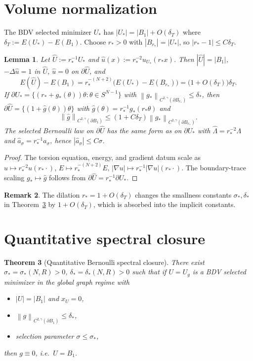 \documentclass[11pt]{article}
\newtheorem{theorem}{Theorem}
\newtheorem{lemma}[theorem]{Lemma}
\theoremstyle{definition}
\newtheorem{remark}[theorem]{Remark}
\newcommand{\norm}[1]{\left\|#1\right\|}
\newcommand{\abs}[1]{\left|#1\right|}
\begin{document}
\section{Volume normalization}\label{sec:volnorm}

The BDV selected minimizer $U_*$ has $\abs{U_*}=\abs{B_1}+O(\delta_T)$ where
$\delta_T:=E(U_*)-E(B_1)$. Choose $r_*>0$ with $\abs{B_{r_*}}=\abs{U_*}$,
so $\abs{r_*-1}\le C\delta_T$.

\begin{lemma}\label{lem:rescale}
Let $\widehat U:=r_*^{-1}U_*$ and $\widehat u(x):=r_*^{-2}u_{U_*}(r_*x)$.
Then $\abs{\widehat U}=\abs{B_1}$, $-\Delta\widehat u=1$ in $\widehat U$,
$\widehat u=0$ on $\partial\widehat U$, and
\[
E(\widehat U)-E(B_1)
=r_*^{-(N+2)}\bigl(E(U_*)-E(B_{r_*})\bigr)
=\bigl(1+O(\delta_T)\bigr)\delta_T.
\]
If $\partial U_*=\{(r_*+g_*(\theta))\theta:\theta\in S^{N-1}\}$
with $\norm{g_*}_{C^{2,\gamma}(\partial B_{r_*})}\le\delta_*$, then
$\partial\widehat U=\{(1+\widehat g(\theta))\theta\}$ with
$\widehat g(\theta)=r_*^{-1}g_*(r_*\theta)$ and
\[
\norm{\widehat g}_{C^{2,\gamma}(\partial B_1)}
\le(1+C\delta_T)\norm{g_*}_{C^{2,\gamma}(\partial B_{r_*})}.
\]
The selected Bernoulli law on $\partial\widehat U$ has the same form as on
$\partial U_*$ with $\widehat\Lambda=r_*^{-2}\Lambda$ and
$\widehat a_\sigma=r_*^{-1}a_\sigma$, hence $\abs{\widehat a_\sigma}\le C\sigma$.
\end{lemma}

\begin{proof}
The torsion equation, energy, and gradient datum scale as $u\mapsto
r_*^{-2}u(r_*\cdot)$, $E\mapsto r_*^{-(N+2)}E$, $\abs{\nabla u}\mapsto
r_*^{-1}\abs{\nabla u}(r_*\cdot)$. The boundary-trace scaling
$g_*\mapsto\widehat g$ follows from $\partial\widehat U=r_*^{-1}\partial U_*$.
\end{proof}

\begin{remark}
The dilation $r_*=1+O(\delta_T)$ changes the smallness constants
$\sigma_*,\delta_*$ in Theorem~\ref{thm:closure} by $1+O(\delta_T)$, which is
absorbed into the implicit constants.
\end{remark}

\section{Quantitative spectral closure}\label{sec:closure}

\begin{theorem}[Quantitative Bernoulli spectral closure]\label{thm:closure}
There exist $\sigma_*=\sigma_*(N,R)>0$, $\delta_*=\delta_*(N,R)>0$ such that
if $U=U_g$ is a BDV selected minimizer in the global graph regime with
\begin{itemize}
\item $\abs{U}=\abs{B_1}$ and $x_U=0$,
\item $\norm{g}_{C^{2,\gamma}(\partial B_1)}\le\delta_*$,
\item selection parameter $\sigma\le\sigma_*$,
\end{itemize}
then $g\equiv0$, i.e.\ $U=B_1$.
\end{theorem}
\end{document}
